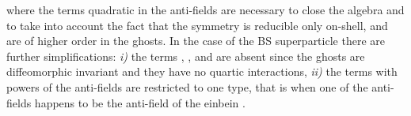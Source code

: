\documentclass[a4paper,12pt]{article}
\begin{document}
where the terms quadratic in the anti-fields are necessary to close
the algebra and to take into account the fact that  
the symmetry is reducible only on-shell, and \coordHE{} are of higher order in the ghosts.  
In the case of the BS
superparticle there are  further simplifications:  
{\it i)} the terms \coordHE{},
\coordHE{}, and  
\coordHE{} are absent since the ghosts
are diffeomorphic invariant and they have no quartic  
interactions,  {\it ii)} the terms with powers of the anti-fields are
restricted to one type, that is when one of the anti-fields \myHighlight{$\Phi^*$}\coordHE{}  
happens to be the anti-field of the einbein \coordHE{}. 
\end{document}
